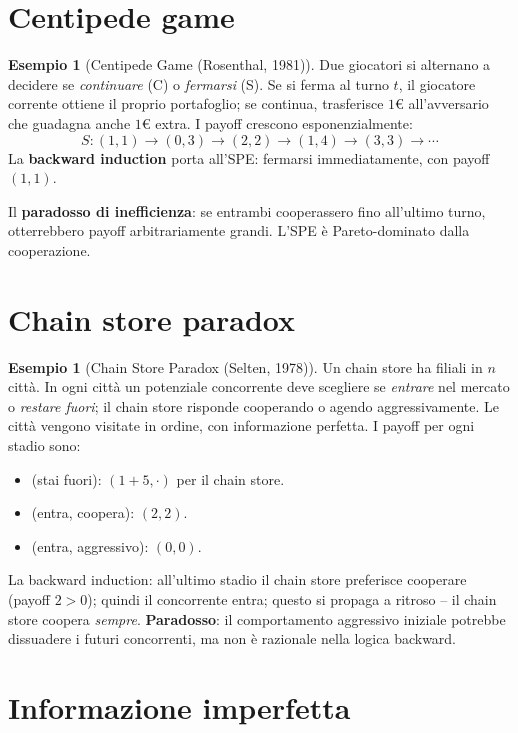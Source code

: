 \documentclass[12pt,a4paper,twoside]{book}
\theoremstyle{plain}
\theoremstyle{definition}
\newtheorem{example}[theorem]{Esempio}
\begin{document}
\section{Centipede game}

\begin{example}[Centipede Game (Rosenthal, 1981)]
Due giocatori si alternano a decidere se \emph{continuare} (C) o \emph{fermarsi} (S). Se si ferma al turno $t$, il giocatore corrente ottiene il proprio portafoglio; se continua, trasferisce $1$€ all'avversario che guadagna anche $1$€ extra. I payoff crescono esponenzialmente:
\[
  S: (1,1)\to (0,3)\to (2,2)\to (1,4)\to (3,3)\to\cdots
\]
La \textbf{backward induction} porta all'SPE: fermarsi immediatamente, con payoff $(1,1)$.

Il \textbf{paradosso di inefficienza}: se entrambi cooperassero fino all'ultimo turno, otterrebbero payoff arbitrariamente grandi. L'SPE è Pareto-dominato dalla cooperazione.
\end{example}

\section{Chain store paradox}

\begin{example}[Chain Store Paradox (Selten, 1978)]
Un chain store ha filiali in $n$ città. In ogni città un potenziale concorrente deve scegliere se \emph{entrare} nel mercato o \emph{restare fuori}; il chain store risponde cooperando o agendo aggressivamente. Le città vengono visitate in ordine, con informazione perfetta. I payoff per ogni stadio sono:
\begin{itemize}
  \item (stai fuori): $(1+5,\cdot)$ per il chain store.
  \item (entra, coopera): $(2,2)$.
  \item (entra, aggressivo): $(0,0)$.
\end{itemize}
La backward induction: all'ultimo stadio il chain store preferisce cooperare (payoff $2>0$); quindi il concorrente entra; questo si propaga a ritroso -- il chain store coopera \emph{sempre}. \textbf{Paradosso}: il comportamento aggressivo iniziale potrebbe dissuadere i futuri concorrenti, ma non è razionale nella logica backward.
\end{example}

\section{Informazione imperfetta}
\end{document}
